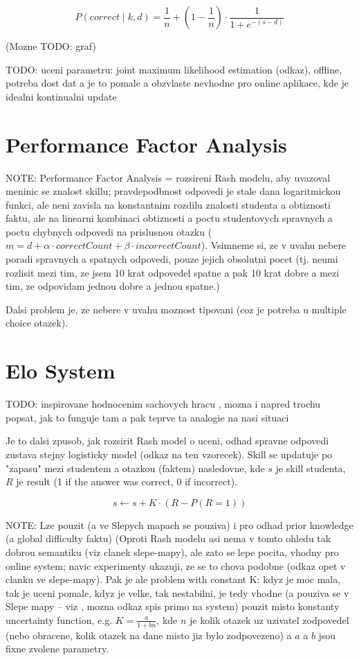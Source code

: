 \documentclass[a4paper, 12pt, twoside]{fithesis2}		%
\renewcommand{\_}{\leavevmode \kern0.0em\vbox{\hrule width0.4em}}
\newcounter{choice}
\begin{document}
$$
P(correct \mid k, d) = \frac{1}{n} + \left( 1 - \frac{1}{n} \right) \cdot \frac{1}{1 + e^{-(s - d)}}
$$

(Mozne TODO: graf)

TODO: uceni parametru: joint maximum likelihood estimation (odkaz), offline, potreba dost dat a je to pomale a obzvlaste nevhodne pro online aplikace, kde je idealni kontinualni update


\section{Performance Factor Analysis}
\label{sec:pfa}

NOTE: Performance Factor Analysis = rozsireni Rash modelu, aby uvazoval meninic se znalost skillu; pravdepodbnost odpovedi je stale dana logaritmickou funkci, ale neni zavisla na konstantnim rozdilu znalosti studenta a obtiznosti faktu, ale na linearni kombinaci obtiznosti a poctu studentovych spravnych a poctu chybnych odpovedi na prislusnou otazku ($m = d + \alpha \cdot correctCount + \beta \cdot incorrectCount$).
Vsimneme si, ze v uvahu nebere poradi spravnych a spatnych odpovedi, pouze jejich obsolutni pocet (tj. neumi rozlisit mezi tim, ze jsem 10 krat odpovedel spatne a pak 10 krat dobre a mezi tim, ze odpovidam jednou dobre a jednou spatne.)

Dalsi problem je, ze nebere v uvahu moznost tipovani (coz je potreba u multiple choice otazek).

\section{Elo System}
\label{sec:elo}


TODO: inspirovane hodnocenim sachovych hracu \cite{elo-rating}, mozna i napred trochu popsat, jak to funguje tam a pak teprve ta analogie na nasi situaci

Je to dalsi zpusob, jak rozsirit Rash model o uceni, odhad spravne odpovedi zustava stejny logisticky model (odkaz na ten vzorecek). Skill se updatuje po "zapasu" mezi studentem a otazkou (faktem) nasledovne,
kde $s$ je skill studenta, $R$ je result (1 if the answer was correct, 0 if incorrect).

$$
s \gets s + K \cdot (R - P(R = 1))
$$

NOTE: Lze pouzit (a ve Slepych mapach \cite{slepe-mapy} se pouziva) i pro odhad prior knowledge (a global difficulty faktu)
(Oproti Rash modelu asi nema v tomto ohledu tak dobrou semantiku (viz clanek slepe-mapy), ale zato se lepe pocita, vhodny pro online system; navic experimenty ukazuji, ze se to chova podobne (odkaz opet v clanku ve slepe-mapy).
Pak je ale problem with constant K: kdyz je moc mala, tak je uceni pomale, kdyz je velke, tak nestabilni, je tedy vhodne (a pouziva se v Slepe mapy -- viz \cite{slepe-mapy}, mozna odkaz spis primo na system) pouzit misto konstanty
uncertainty function, e.g. $K = \frac{a}{1 + bn}$, kde $n$ je kolik otazek uz uzivatel zodpovedel (nebo obracene, kolik otazek na dane misto jiz bylo zodpovezeno) a $a$ a $b$ jsou fixne zvolene parametry.
\end{document}
